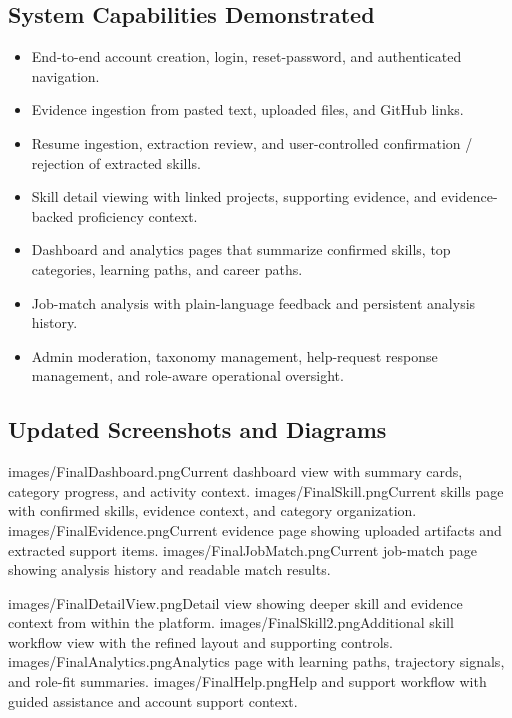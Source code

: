 \documentclass[11pt]{article}
\begin{document}
\subsection*{System Capabilities Demonstrated}
\begin{itemize}
  \item End-to-end account creation, login, reset-password, and authenticated navigation.
  \item Evidence ingestion from pasted text, uploaded files, and GitHub links.
  \item Resume ingestion, extraction review, and user-controlled confirmation / rejection of extracted skills.
  \item Skill detail viewing with linked projects, supporting evidence, and evidence-backed proficiency context.
  \item Dashboard and analytics pages that summarize confirmed skills, top categories, learning paths, and career paths.
  \item Job-match analysis with plain-language feedback and persistent analysis history.
  \item Admin moderation, taxonomy management, help-request response management, and role-aware operational oversight.
\end{itemize}

\subsection*{Updated Screenshots and Diagrams}

  {images/FinalDashboard.png}{Current dashboard view with summary cards, category progress, and activity context.}
  {images/FinalSkill.png}{Current skills page with confirmed skills, evidence context, and category organization.}
  {images/FinalEvidence.png}{Current evidence page showing uploaded artifacts and extracted support items.}
  {images/FinalJobMatch.png}{Current job-match page showing analysis history and readable match results.}

  {images/FinalDetailView.png}{Detail view showing deeper skill and evidence context from within the platform.}
  {images/FinalSkill2.png}{Additional skill workflow view with the refined layout and supporting controls.}
  {images/FinalAnalytics.png}{Analytics page with learning paths, trajectory signals, and role-fit summaries.}
  {images/FinalHelp.png}{Help and support workflow with guided assistance and account support context.}
\end{document}
